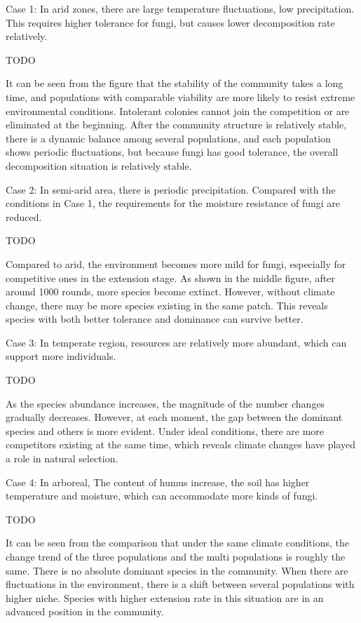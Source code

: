 \documentclass{mcmthesis}
\begin{document}
Case 1: In arid zones, there are large temperature fluctuations, low precipitation. This requires higher tolerance for fungi, but causes lower decomposition rate relatively.

TODO

It can be seen from the figure that the stability of the community takes a long time, and populations with comparable viability are more likely to resist extreme environmental conditions. Intolerant colonies cannot join the competition or are eliminated at the beginning. After the community structure is relatively stable, there is a dynamic balance among several populations, and each population shows periodic fluctuations, but because fungi has good tolerance, the overall decomposition situation is relatively stable.

Case 2: In semi-arid area, there is periodic precipitation. Compared with the conditions in Case 1, the requirements for the moisture resistance of fungi are reduced.

TODO

Compared to arid, the environment becomes more mild for fungi, especially for competitive ones in the extension stage. As shown in the middle figure, after around 1000 rounds, more species become extinct. However, without climate change, there may be more species existing in the same patch. This reveals species with both better tolerance and dominance can survive better.

Case 3: In temperate region, resources are relatively more abundant, which can support more individuals.

TODO

As the species abundance increases, the magnitude of the number changes gradually decreases. However, at each moment, the gap between the dominant species and others is more evident. Under ideal conditions, there are more competitors existing at the same time, which reveals climate changes have played a role in natural selection.

Case 4: In arboreal, The content of humus increase, the soil has higher temperature and moisture, which can accommodate more kinds of fungi.

TODO

It can be seen from the comparison that under the same climate conditions, the change trend of the three populations and the multi populations is roughly the same. There is no absolute dominant species in the community. When there are fluctuations in the environment, there is a shift between several populations with higher niche. Species with higher extension rate in this situation are in an advanced position in the community.
\end{document}
